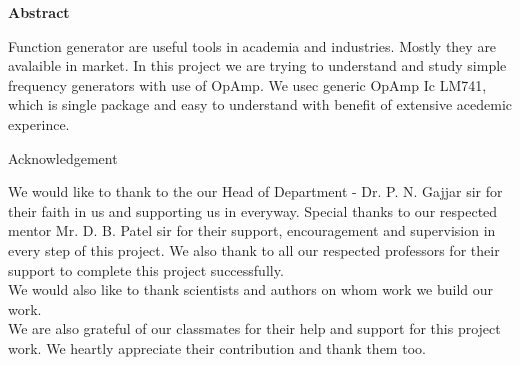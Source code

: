 \documentclass[14pt,a4paper]{extarticle}
\begin{document}
\vspace*{\fill}
\begin{center}
\colorbox{bg1}{ \begin{minipage}{.95\textwidth}\centering \vspace{1.5cm} \Large \textbf{Abstract}\\
\begin{minipage}{0.8\textwidth} \vspace{.8cm} \normalsize Function generator are useful tools in academia and industries. Mostly they are avalaible in market. In this project we are trying to understand and study simple frequency generators with use of OpAmp. We usec generic OpAmp Ic LM741, which is single package and easy to understand with benefit of extensive acedemic experince. \vspace{1.5cm} \end{minipage}
\end{minipage}}
\end{center}
\vspace*{\fill}
\pagebreak

\vspace*{\fill}
\begin{center}
\begin{huge}
Acknowledgement\\
\end{huge}
\end{center}
\vspace{2cm}
\begin{large}
We would like to thank to the our Head of Department
- Dr. P. N. Gajjar sir for their faith in us and
supporting us in everyway. Special thanks to our
respected mentor Mr. D. B. Patel sir for their support,
encouragement and supervision in every step of this
project. We also thank to all our respected professors
for their support to complete this project successfully.\\
We would also like to thank scientists and authors on
whom work we build our work.\\
We are also grateful of our classmates for their help
and support for this project work. We heartly
appreciate their contribution and thank them too.\\
\end{large}

\vspace*{\fill}
\pagebreak


\renewcommand*\contentsname{Table Of Contents}
\tableofcontents
\pagebreak
{} 
\setcounter{page}{1}
\end{document}

